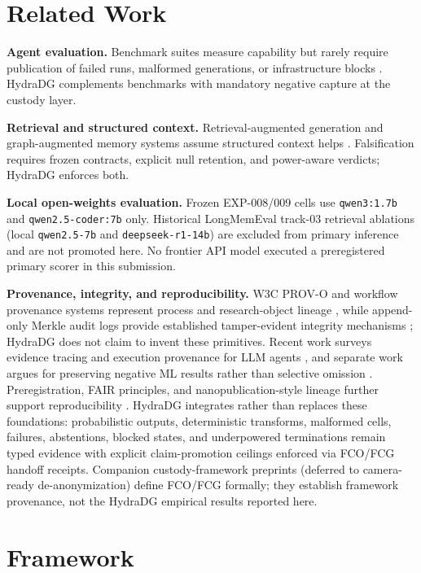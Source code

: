 \documentclass{article}
\begin{document}
\section{Related Work}

\textbf{Agent evaluation.} Benchmark suites measure capability but rarely require publication of failed runs, malformed generations, or infrastructure blocks \cite{liu2023agentbench,zhou2023webarena}.
HydraDG complements benchmarks with mandatory negative capture at the custody layer.

\textbf{Retrieval and structured context.} Retrieval-augmented generation and graph-augmented memory systems assume structured context helps \cite{lewis2020rag,edge2024graphrag}.
Falsification requires frozen contracts, explicit null retention, and power-aware verdicts; HydraDG enforces both.

\textbf{Local open-weights evaluation.} Frozen EXP-008/009 cells use \texttt{qwen3:1.7b} and \texttt{qwen2.5-coder:7b} only.
Historical LongMemEval track-03 retrieval ablations (local \texttt{qwen2.5-7b} and \texttt{deepseek-r1-14b}) are excluded from primary inference and are not promoted here.
No frontier API model executed a preregistered primary scorer in this submission.

\textbf{Provenance, integrity, and reproducibility.}
W3C PROV-O and workflow provenance systems represent process and research-object lineage \cite{lebo2013provo,khan2019cwlprov}, while append-only Merkle audit logs provide established tamper-evident integrity mechanisms \cite{laurie2013ct}; HydraDG does not claim to invent these primitives.
Recent work surveys evidence tracing and execution provenance for LLM agents \cite{wang2026agentprovenance}, and separate work argues for preserving negative ML results rather than selective omission \cite{karl2024negative}.
Preregistration, FAIR principles, and nanopublication-style lineage further support reproducibility \cite{nosek2018prereg,wilkinson2016fair,groth2010nano}.
HydraDG integrates rather than replaces these foundations: probabilistic outputs, deterministic transforms, malformed cells, failures, abstentions, blocked states, and underpowered terminations remain typed evidence with explicit claim-promotion ceilings enforced via FCO/FCG handoff receipts.
Companion custody-framework preprints (deferred to camera-ready de-anonymization) define FCO/FCG formally; they establish framework provenance, not the HydraDG empirical results reported here.

\section{Framework}
\end{document}
